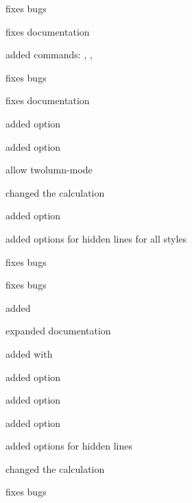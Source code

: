 \documentclass[parskip=false,english,11pt]{ltxmdf}
\begin{document}
\begin{itemize*}
\item fixes bugs
\item fixes documentation
\end{itemize*}

\begin{itemize*}
\item  added commands: , , 
\item fixes bugs
\item fixes documentation
\end{itemize*}

\begin{itemize*}
\item added option 
\item added option 
\item allow twolumn-mode
\item changed the calculation
\item added option 
\item added options for hidden lines for all styles
\item fixes bugs
\end{itemize*}

\begin{itemize*}
\item fixes bugs
\item added 
\item expanded documentation
\end{itemize*}



\begin{itemize*}
\item added  with 
\item added option 
\item added option 
\item added option 
\item added options for hidden lines 
\item changed the calculation
\item fixes bugs
\end{itemize*}
\end{document}
